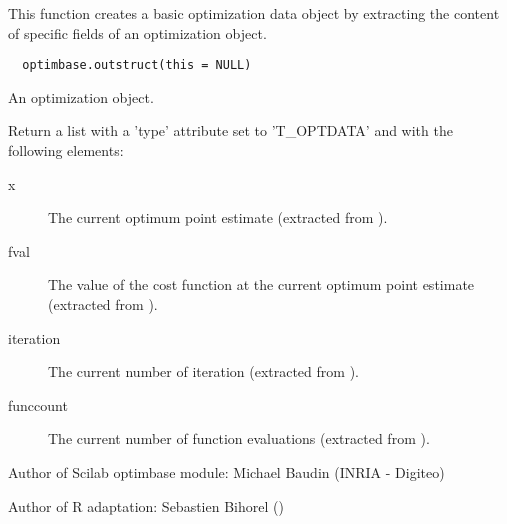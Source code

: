 %
\begin{Description}\relax
This function creates a basic optimization data object by extracting the
content of specific fields of an optimization object.
\end{Description}
%
\begin{Usage}
\begin{verbatim}
  optimbase.outstruct(this = NULL)
\end{verbatim}
\end{Usage}
%
\begin{Arguments}
\begin{ldescription}
\item[\code{this}] An optimization object.
\end{ldescription}
\end{Arguments}
%
\begin{Value}
Return a list with a 'type' attribute set to 'T\_OPTDATA' and with the
following elements: \begin{description}

\item[x] The current optimum point estimate (extracted from
).
\item[fval] The value of the cost function at the current optimum point
estimate (extracted from ).
\item[iteration] The current number of iteration (extracted
from ).
\item[funccount] The current number of function evaluations (extracted from
).

\end{description}

\end{Value}
%
\begin{Author}\relax
Author of Scilab optimbase module: Michael Baudin (INRIA - Digiteo)

Author of R adaptation: Sebastien Bihorel ()
\end{Author}
